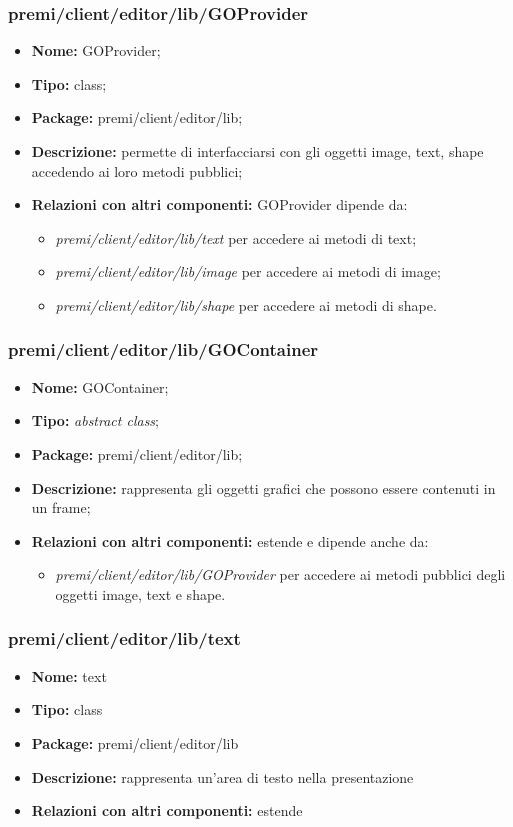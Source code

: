 \subsubsection{premi/client/editor/lib/GOProvider}
\begin{itemize}
  \item[] \textbf{Nome:} GOProvider;
  \item[] \textbf{Tipo:} class;
  \item[] \textbf{Package:} premi/client/editor/lib;
  \item[] \textbf{Descrizione:} permette di interfacciarsi con gli oggetti image, text, shape accedendo ai loro metodi pubblici;
  \item[] \textbf{Relazioni con altri componenti:} GOProvider dipende da:
  \begin{itemize}
  	\item \textit{premi/client/editor/lib/text} per accedere ai metodi di text;
  	\item \textit{premi/client/editor/lib/image} per accedere ai metodi di image;
  	\item \textit{premi/client/editor/lib/shape} per accedere ai metodi di shape.
  \end{itemize}
\end{itemize}
\subsubsection{premi/client/editor/lib/GOContainer}
\begin{itemize}
  \item[] \textbf{Nome:} GOContainer;
  \item[] \textbf{Tipo:} \textit{abstract class};
  \item[] \textbf{Package:} premi/client/editor/lib;
  \item[] \textbf{Descrizione:} rappresenta gli oggetti grafici che possono essere contenuti in un frame; 
  \item[] \textbf{Relazioni con altri componenti:} estende  e dipende anche da:
  \begin{itemize} 
	\item \textit{premi/client/editor/lib/GOProvider} per accedere ai metodi pubblici degli oggetti image, text e shape.
\end{itemize}  
\end{itemize}
\subsubsection{premi/client/editor/lib/text}
\begin{itemize}
  \item[] \textbf{Nome:} text
  \item[] \textbf{Tipo:} class
  \item[] \textbf{Package:} premi/client/editor/lib
  \item[] \textbf{Descrizione:} rappresenta un'area di testo nella presentazione
  \item[] \textbf{Relazioni con altri componenti:} estende 
\end{itemize}
